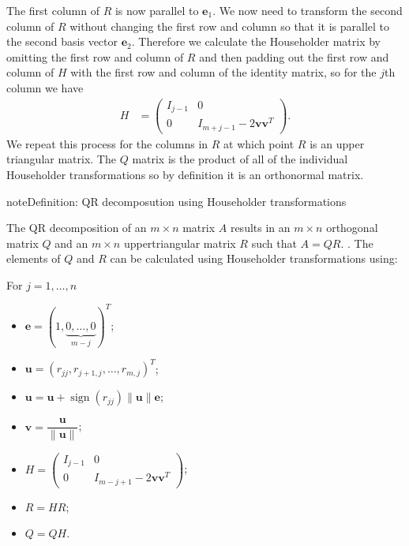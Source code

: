 \documentclass[letterpaper,10pt,english]{jupyterBook}
\begin{document}
\sphinxAtStartPar
The first column of \(R\) is now parallel to \(\mathbf{e}_1\). We now need to transform the second column of \(R\) without changing the first row and column so that it is parallel to the second basis vector \(\mathbf{e}_2\). Therefore we calculate the Householder matrix by omitting the first row and column of \(R\) and then padding out the first row and column of \(H\) with the first row and column of the identity matrix, so for the \(j\)th column we have
\begin{align*}
    H &= \begin{pmatrix} 
        I_{j-1} & 0 \\
        0 & I_{m+j-1} - 2 \mathbf{v} \mathbf{v}^T
    \end{pmatrix}.
\end{align*}
\sphinxAtStartPar
We repeat this process for the columns in \(R\) at which point \(R\) is an upper triangular matrix. The \(Q\) matrix is the product of all of the individual Householder transformations so by definition it is an orthonormal matrix.

\begin{sphinxadmonition}{note}{Definition: QR decomposution using Householder transformations}

\sphinxAtStartPar
The QR decomposition of an \(m\times n\) matrix \(A\) results in an \(m\times n\) orthogonal matrix \(Q\) and an \(m\times n\) upper\sphinxhyphen{}triangular matrix \(R\) such that \(A = QR\). . The elements of \(Q\) and \(R\) can be calculated using Householder transformations using:

\sphinxAtStartPar
For \(j = 1, \ldots, n\)
\begin{itemize}
\item {} 
\sphinxAtStartPar
\(\mathbf{e} = (1, \underbrace{0, \ldots, 0}_{m-j})^T\);

\item {} 
\sphinxAtStartPar
\(\mathbf{u} = (r_{jj}, r_{j+1,j}, \ldots, r_{m,j})^T\);

\item {} 
\sphinxAtStartPar
\(\mathbf{u} = \mathbf{u} + \operatorname{sign}(r_{jj})\|\mathbf{u}\|\mathbf{e}\);

\item {} 
\sphinxAtStartPar
\(\mathbf{v} = \dfrac{\mathbf{u}}{\| \mathbf{u} \|}\);

\item {} 
\sphinxAtStartPar
\(H = \begin{pmatrix}
      I_{j-1} & 0 \\
      0 & I_{m-j+1} - 2 \mathbf{v}\mathbf{v}^T
  \end{pmatrix}\);

\item {} 
\sphinxAtStartPar
\(R = H R\);

\item {} 
\sphinxAtStartPar
\(Q = Q H\).

\end{itemize}
\end{sphinxadmonition}
\end{document}
